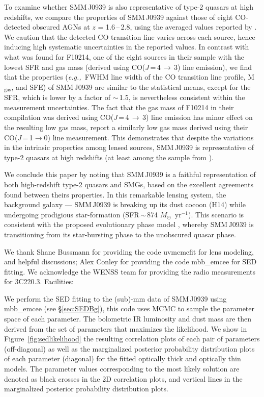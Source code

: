 \documentclass[twocolumn,apj,numberedappendix]{emulateapj}
\newcommand{\Msun}{\mbox{$M_{\odot}$}}
\newcommand{\rarr}{$\rightarrow$}
\newcommand{\eg}{{\sl e.g.,~}}
\newcommand{\pmOne}{\mbox{$^{-1}$}}
\begin{document}
To examine whether SMM\,J0939 is also representative of type-2 quasars at high redshifts, we compare the properties of SMM\,J0939 
against those of eight CO-detected obscured AGNs at $z$ = 1.6\,--\,2.8, using the averaged values reported by \citet[][and references 
therein]{Polletta11a}. We caution that the detected CO 
transition line varies across each source, 
hence inducing high systematic uncertainties in the reported values. 
In contrast with what was found for F10214, one of the eight sources in their sample with the lowest SFR and gas mass (derived using CO($J$\,=\,4\,\rarr\,3) line emission), we find that the properties 
(\eg FWHM line width of the CO transition line profile, M$_\textrm{gas}$, and SFE) of SMM\,J0939 are similar to the statistical means, except for the SFR, which is lower by a 
factor of $\sim$\,1.5, is nevertheless consistent within the measurement uncertainties. The fact that the gas mass of F10214 in their compilation was derived using CO($J$\,=\,4\,\rarr\,3) line emission has minor effect on the resulting low gas mass, \citet{Riechers11a} report a similarly low gas mass derived using their CO($J$\,=\,1\rarr0) line measurement. This demonstrates that despite the variations in the intrinsic properties among lensed sources,
 SMM\,J0939 is representative of type-2 quasars at high redshifts (at least among the sample from \citet{Polletta11a}). 

We conclude this paper by noting that SMM\,J0939 is a faithful representation of both high-redshift type-2 quasars and SMGs, 
based on the excellent agreements found between theirs properties. In this remarkable lensing system, the background galaxy --- SMM\,J0939 is 
breaking up its dust cocoon (H14) while undergoing prodigious star-formation (SFR\,$\sim$\,874 \Msun~yr\pmOne). 
This scenario is consistent with the proposed evolutionary phase model \citep{Coppin08a,Simpson12a}, whereby SMM\,J0939 is transitioning from its star-bursting phase to the unobscured quasar phase. 

\acknowledgments
We thank Shane Bussmann for providing the code {\sc uvmcmcfit} for lens modeling, and helpful discussions; Alex Conley for providing the code {\sc mbb\_emcee} for SED fitting. We acknowledge the WENSS team for providing the radio measurements for 3C220.3. 
Facilities: 
\newpage



\appendix
We perform the SED fitting to the (sub)-mm data of SMM\,J0939 using {\sc mbb\_emcee} (see \S \ref{sec:SEDBg}), this code uses MCMC to sample the parameter space of each parameter. The bolometric IR luminosity and dust mass are then derived from the set of parameters that maximizes the likelihood. 
We show in Figure~\ref{fig:sedlikelihood} the resulting correlation plots of each pair of parameters (off-diagonal) as well as the marginalized posterior probability distribution plots of each parameter (diagonal) for the fitted optically thick and optically thin models.
The parameter values corresponding to the most likely solution are denoted as black crosses in the 2D correlation plots, and vertical lines in the marginalized posterior probability distribution plots. \par
\end{document}
